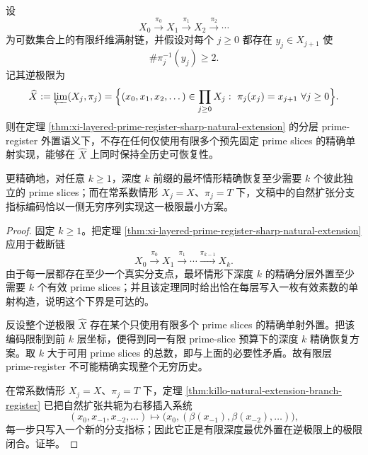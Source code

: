 \begin{theorem}\label{thm:xi-time-part63b-infinite-depth-finite-prime-register-impossibility}
设
\[
X_0\xrightarrow{\pi_0}X_1\xrightarrow{\pi_1}X_2\xrightarrow{\pi_2}\cdots
\]
为可数集合上的有限纤维满射链，并假设对每个 \(j\ge 0\) 都存在 \(y_j\in X_{j+1}\) 使
\[
\#\pi_j^{-1}(y_j)\ge 2.
\]
记其逆极限为
\[
\widehat X
:=
\varprojlim(X_j,\pi_j)
=
\Bigl\{(x_0,x_1,x_2,\dots)\in \prod_{j\ge 0}X_j:\ \pi_j(x_j)=x_{j+1}\ \forall j\ge 0\Bigr\}.
\]
则在定理 \ref{thm:xi-layered-prime-register-sharp-natural-extension} 的分层 prime-register 外置语义下，不存在任何仅使用有限多个预先固定 prime slices 的精确单射实现，能够在 \(\widehat X\) 上同时保持全历史可恢复性。

更精确地，对任意 \(k\ge 1\)，深度 \(k\) 前缀的最坏情形精确恢复至少需要 \(k\) 个彼此独立的 prime slices；而在常系数情形 \(X_j=X\)、\(\pi_j=T\) 下，文稿中的自然扩张分支指标编码恰以一侧无穷序列实现这一极限最小方案。
\end{theorem}
\begin{proof}
固定 \(k\ge 1\)。把定理 \ref{thm:xi-layered-prime-register-sharp-natural-extension} 应用于截断链
\[
X_0\xrightarrow{\pi_0}X_1\xrightarrow{\pi_1}\cdots\xrightarrow{\pi_{k-1}}X_k.
\]
由于每一层都存在至少一个真实分支点，最坏情形下深度 \(k\) 的精确分层外置至少需要 \(k\) 个有效 prime slices；并且该定理同时给出恰在每层写入一枚有效素数的单射构造，说明这个下界是可达的。

反设整个逆极限 \(\widehat X\) 存在某个只使用有限多个 prime slices 的精确单射外置。把该编码限制到前 \(k\) 层坐标，便得到同一有限 prime-slice 预算下的深度 \(k\) 精确恢复方案。取 \(k\) 大于可用 prime slices 的总数，即与上面的必要性矛盾。故有限层 prime-register 不可能精确实现整个无穷历史。

在常系数情形 \(X_j=X\)、\(\pi_j=T\) 下，定理 \ref{thm:killo-natural-extension-branch-register} 已把自然扩张共轭为右移插入系统
\[
(x_0,x_{-1},x_{-2},\dots)\longmapsto
\bigl(x_0,(\beta(x_{-1}),\beta(x_{-2}),\dots)\bigr),
\]
每一步只写入一个新的分支指标；因此它正是有限深度最优外置在逆极限上的极限闭合。证毕。
\end{proof}

